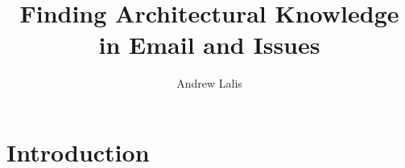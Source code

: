 \documentclass{article}
\title{Finding Architectural Knowledge in Email and Issues}
\author{Andrew Lalis}
\begin{document}
\maketitle

\section*{Introduction}
	\begin{multicols}{2}
		
	\end{multicols}
\end{document}
